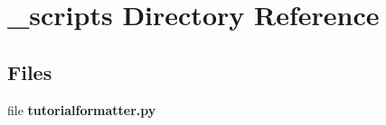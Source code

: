 \section{\-\_\-scripts Directory Reference}
\label{dir_1dd70f81822c62ded36c497c533af367}
\subsection*{Files}
\begin{DoxyCompactItemize}
\item 
file {\bfseries tutorialformatter.\-py}
\end{DoxyCompactItemize}
